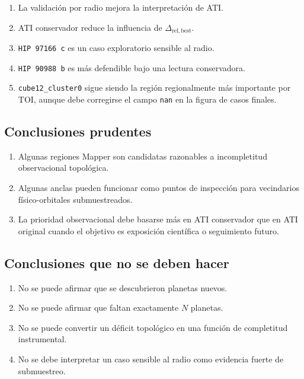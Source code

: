 \documentclass[11pt]{article}
\begin{document}
\begin{enumerate}
    \item La validación por radio mejora la interpretación de ATI.
    \item ATI conservador reduce la influencia de $\Delta_{\mathrm{rel,best}}$.
    \item \texttt{HIP 97166 c} es un caso exploratorio sensible al radio.
    \item \texttt{HIP 90988 b} es más defendible bajo una lectura conservadora.
    \item \texttt{cube12\_cluster0} sigue siendo la región regionalmente más importante por TOI, aunque debe corregirse el campo \texttt{nan} en la figura de casos finales.
\end{enumerate}

\subsection{Conclusiones prudentes}

\begin{enumerate}
    \item Algunas regiones Mapper son candidatas razonables a incompletitud observacional topológica.
    \item Algunas anclas pueden funcionar como puntos de inspección para vecindarios físico-orbitales submuestreados.
    \item La prioridad observacional debe basarse más en ATI conservador que en ATI original cuando el objetivo es exposición científica o seguimiento futuro.
\end{enumerate}

\subsection{Conclusiones que no se deben hacer}

\begin{enumerate}
    \item No se puede afirmar que se descubrieron planetas nuevos.
    \item No se puede afirmar que faltan exactamente $N$ planetas.
    \item No se puede convertir un déficit topológico en una función de completitud instrumental.
    \item No se debe interpretar un caso sensible al radio como evidencia fuerte de submuestreo.
\end{enumerate}
\end{document}
